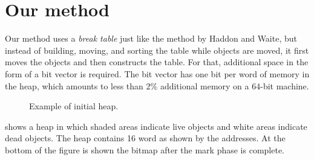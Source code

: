 \section{Our method}

Our method uses a \emph{break table} just like the method by Haddon
and Waite, but instead of building, moving, and sorting the table
while objects are moved, it first moves the objects and then
constructs the table.  For that, additional space in the form of a bit
vector is required.  The bit vector has one bit per word of memory in
the heap, which amounts to less than $2$\% additional memory on a
$64$-bit machine. 

\begin{figure}
\begin{center}
\end{center}
\caption{\label{fig-example-a}
Example of initial heap.}
\end{figure}

 shows a heap in which shaded areas indicate
live objects and white areas indicate dead objects.  The heap contains
16 word as shown by the addresses.  At the bottom of the figure is
shown the bitmap after the mark phase is complete.
